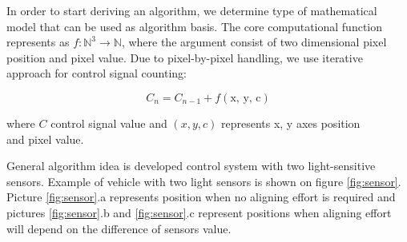 \documentclass[a4paper,12pt]{article} %
\begin{document}
\begin{enumerate}
	In order to start deriving an algorithm, we determine type of mathematical model that can be used as algorithm basis. The core computational function represents as \hspace{2pt} $f:\mathbb{N}^3	\longrightarrow \mathbb{N} $, where the argument consist of two dimensional pixel position and pixel value. Due to pixel-by-pixel handling, we use iterative approach for control signal counting:
	
	\begin{equation*}
		C_n = C_{n-1} + f(\text{x, y, c})		
	\end{equation*}
	
	\begin{flushright}
		\footnotesize where $C$ control signal value and $(x, y, c)$ represents x, y axes position\\ and pixel value.
	\end{flushright}
	
	General algorithm idea is developed control system with two light-sensitive sensors. Example of vehicle with two light sensors is shown on figure \ref{fig:sensor}. Picture \ref{fig:sensor}.a represents position when no aligning effort is required and pictures \ref{fig:sensor}.b and \ref{fig:sensor}.c represent positions when aligning effort will depend on the difference of sensors value.  
	

\end{enumerate}
\end{document}

